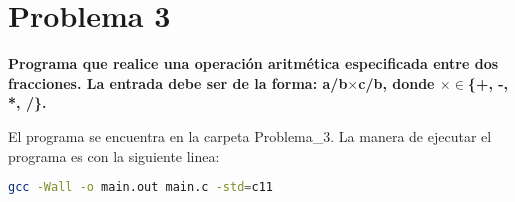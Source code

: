 \section*{Problema 3}
\textbf{Programa que realice una operación aritmética especificada entre dos fracciones. La entrada debe ser de la forma: a/b$\times$c/b, donde  $\times \in$\{+, -, *, /\}.}

El programa se encuentra en la carpeta \textcolor{citecolor}{Problema\_3}. La manera de ejecutar el programa es con la siguiente linea:
\begin{lstlisting}[language=bash]
    gcc -Wall -o main.out main.c -std=c11
\end{lstlisting}